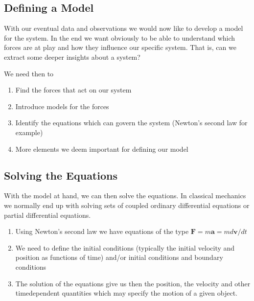 \documentclass[letterpaper,10pt,english]{sphinxmanual}
\begin{document}
\subsection{Defining a Model}
\label{\detokenize{chapter3:defining-a-model}}
With our eventual data and observations we would now like to develop a
model for the system. In the end we want obviously to be able to
understand which forces are at play and how they influence our
specific system. That is, can we extract some deeper insights about a
system?

We need then to
\begin{enumerate}
%
\item {} 
Find the forces that act on our system

\item {} 
Introduce models for the forces

\item {} 
Identify the equations which can govern the system (Newton’s second law for example)

\item {} 
More elements we deem important for defining our model

\end{enumerate}


\subsection{Solving the Equations}
\label{\detokenize{chapter3:solving-the-equations}}
With the model at hand, we can then solve the equations. In classical mechanics we normally end up  with solving sets of coupled ordinary differential equations or partial differential equations.
\begin{enumerate}
%
\item {} 
Using Newton’s second law we have equations of the type \(\boldsymbol{F}=m\boldsymbol{a}=md\boldsymbol{v}/dt\)

\item {} 
We need to  define the initial conditions (typically the initial velocity and position as functions of time) and/or initial conditions and boundary conditions

\item {} 
The solution of the equations give us then the position, the velocity and other time\sphinxhyphen{}dependent quantities which may specify the motion of a given object.

\end{enumerate}
\end{document}
